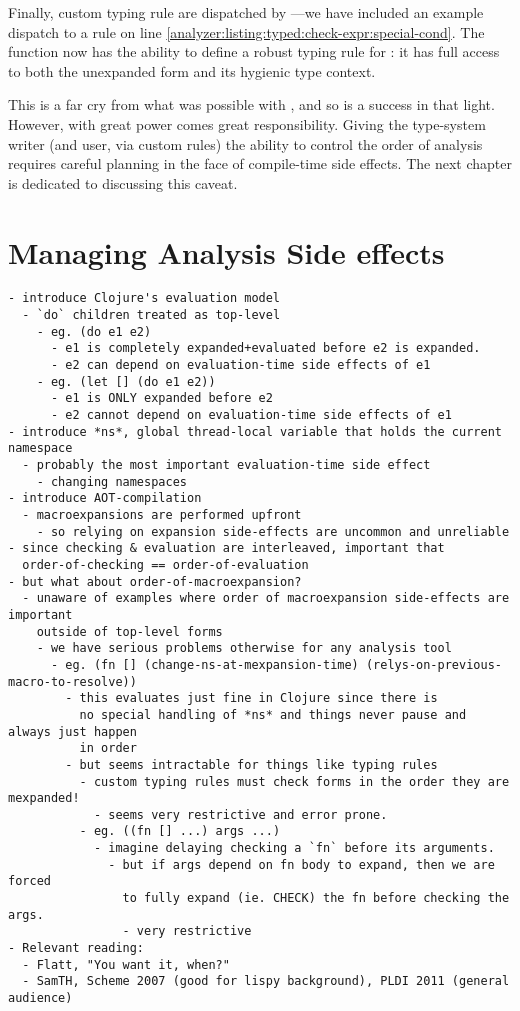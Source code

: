 Finally, custom typing rule are dispatched by ---we have included
an example dispatch to a  rule on line \ref{analyzer:listing:typed:check-expr:special-cond}.
The  function now has the ability
to define a robust typing rule for : it has full access to both
the unexpanded  form and its hygienic type context.

This is a far cry from what was possible with ,
and so  is a success in that light.
However, with great power comes great responsibility.
Giving the type-system writer (and user, via custom rules)
the ability to control the order of analysis
requires careful planning in the face of compile-time side effects.
The next chapter is dedicated to discussing this caveat.

\chapter{Managing Analysis Side effects}

{
\singlespacing
\begin{verbatim}
- introduce Clojure's evaluation model
  - `do` children treated as top-level
    - eg. (do e1 e2)
      - e1 is completely expanded+evaluated before e2 is expanded.
      - e2 can depend on evaluation-time side effects of e1
    - eg. (let [] (do e1 e2))
      - e1 is ONLY expanded before e2
      - e2 cannot depend on evaluation-time side effects of e1
- introduce *ns*, global thread-local variable that holds the current namespace
  - probably the most important evaluation-time side effect
    - changing namespaces
- introduce AOT-compilation
  - macroexpansions are performed upfront
    - so relying on expansion side-effects are uncommon and unreliable
- since checking & evaluation are interleaved, important that
  order-of-checking == order-of-evaluation
- but what about order-of-macroexpansion?
  - unaware of examples where order of macroexpansion side-effects are important
    outside of top-level forms
    - we have serious problems otherwise for any analysis tool
      - eg. (fn [] (change-ns-at-mexpansion-time) (relys-on-previous-macro-to-resolve))
        - this evaluates just fine in Clojure since there is
          no special handling of *ns* and things never pause and always just happen
          in order
        - but seems intractable for things like typing rules
          - custom typing rules must check forms in the order they are mexpanded!
            - seems very restrictive and error prone.
          - eg. ((fn [] ...) args ...)
            - imagine delaying checking a `fn` before its arguments.
              - but if args depend on fn body to expand, then we are forced
                to fully expand (ie. CHECK) the fn before checking the args.
                - very restrictive
- Relevant reading:
  - Flatt, "You want it, when?"
  - SamTH, Scheme 2007 (good for lispy background), PLDI 2011 (general audience)
\end{verbatim}
}


